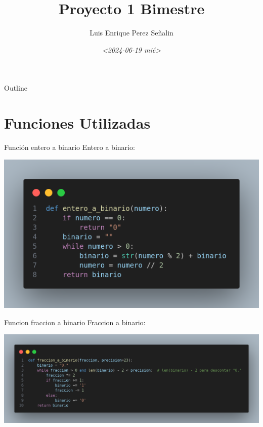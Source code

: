 \documentclass[presentation]{beamer}
\author{Luis Enrique Perez Señalin}
\date{\textit{<2024-06-19 mié>}}
\title{Proyecto 1 Bimestre}
\begin{document}
\maketitle
\begin{frame}{Outline}
\tableofcontents
\end{frame}


\section{Funciones Utilizadas}
\label{sec:orga2c70d9}

\begin{frame}[label={sec:org8be4009}]{Función entero a binario}
Entero a binario:
\begin{center}
\includegraphics[width=.9\linewidth]{./img_codigo/entero_binario.png}
\end{center} 
\end{frame}

\begin{frame}[label={sec:orgf1562c5}]{Funcion fraccion a binario}
Fraccion a binario:
\begin{center}
\includegraphics[width=.9\linewidth]{./img_codigo/fraccion_binario.png}
\end{center} 
\end{frame}
\end{document}

